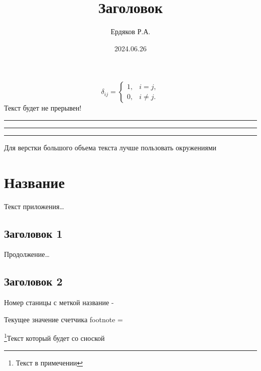 \documentclass[a4paper,12pt,onecolumn]{article}
\begin{document}
\title{Заголовок}
\author{Ердяков Р.А.}
\date{2024.06.26}
\maketitle

$$ \delta_{ij} =
\begin{cases}
1, & i=j,\\
0, & i\ne j.
\end{cases} $$
\newline
Текст %
будет не %
прерывен! %
\newline
\rule[10pt]{25pt}{1pt}
\newline
\rule[-5pt]{10pt}{10pt}
\newline
\rule{6pt}{6pt}
\newline
\begin{itshape}
Для верстки большого объема текста лучше пользовать окружениями
\end{itshape}
\newline
\appendix
\section{Название}\label{section_name}
Текст приложения\dots
\subsection{Заголовок 1}\label{section_1}
Продолжение\dots
\subsection{Заголовок 2}\label{section_2}
\tableofcontents

Номер станицы с меткой название - \pageref{section_name}

\setcounter{footnote}{0}
\addtocounter{footnote}{2}
Текущее значение счетчика footnote = \thefootnote

\footnote{Текст в примечении}{Текст который будет со сноской}
\end{document}
